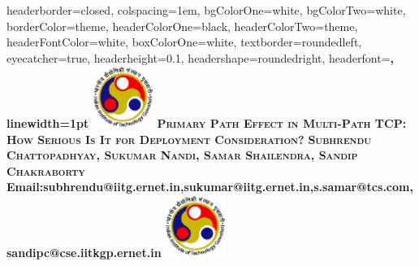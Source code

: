 \documentclass[landscape,paperwidth=36in,paperheight=48in,fontscale=0.48]{baposter} %
\begin{document}
\begin{poster}
{
headerborder=closed, %
colspacing=1em, %
bgColorOne=white, %
bgColorTwo=white, %
borderColor=theme, %
headerColorOne=black, %
headerColorTwo=theme, %
headerFontColor=white, %
boxColorOne=white, %
textborder=roundedleft, %
eyecatcher=true, %
headerheight=0.1\textheight, %
headershape=roundedright, %
headerfont=\LARGE\bf\textsc, %
linewidth=1pt %
}
%
{\includegraphics[height=2cm]{Logo/iitg_logo.eps}} %
{\bf\textsc{Primary Path Effect in Multi-Path TCP: How Serious Is It for Deployment Consideration?}\vspace{0.5em}} %
{\bf{\textsc{ Subhrendu Chattopadhyay, Sukumar Nandi, Samar Shailendra, Sandip Chakraborty}}\vspace{0.5em}
\bf{{Email:{subhrendu@iitg.ernet.in,sukumar@iitg.ernet.in,s.samar@tcs.com,sandipc@cse.iitkgp.ernet.in}}}}
{\includegraphics[height=2cm]{Logo/iitg_logo.eps}} %

\end{poster}
\end{document}
